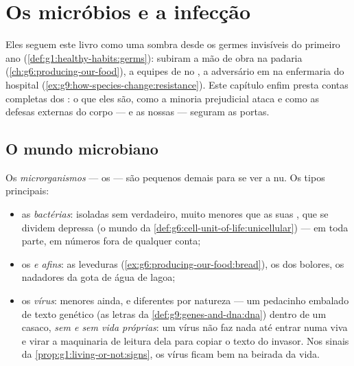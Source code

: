 \chapter{Os micróbios e a infecção}\label{ch:g9:microbes-and-infection}

Eles seguem este livro como uma sombra desde os germes
invisíveis do primeiro ano
(\cref{def:g1:healthy-habits:germs}): subiram a mão de obra
na padaria (\cref{ch:g6:producing-our-food}), a equipes de
 no , a adversário em  na
enfermaria do hospital
(\cref{ex:g9:how-species-change:resistance}). Este capítulo
enfim presta contas completas dos : o que eles são,
como a minoria prejudicial ataca e como as defesas externas
do corpo --- e as nossas --- seguram as portas.

\section{O mundo microbiano}

\begin{definition}\label{def:g9:microbes-and-infection:sorted}
Os \emph{microrganismos} --- os
 --- são  pequenos demais para se ver a
 nu. Os tipos principais:
\begin{itemize}
  \item as \emph{bactérias}:  isoladas
        sem  verdadeiro, muito menores que as suas
        , que se dividem depressa (o mundo da
        \cref{def:g6:cell-unit-of-life:unicellular}) --- em
        toda parte, em números fora de qualquer conta;
  \item os \emph{  e afins}: as leveduras
        (\cref{ex:g6:producing-our-food:bread}), os 
        dos bolores, os nadadores da gota de água de lagoa;
  \item os \emph{vírus}: menores ainda, e
        diferentes por natureza --- um pedacinho embalado de
        texto genético (as letras da
        \cref{def:g9:genes-and-dna:dna}) dentro de um casaco,
        \emph{sem  e sem vida próprias}: um vírus não
        faz nada até entrar numa  viva e virar a
        maquinaria de leitura dela para copiar o texto do
        invasor. Nos sinais da
        \cref{prop:g1:living-or-not:signs}, os vírus ficam
        bem na beirada da vida.
\end{itemize}
\end{definition}

